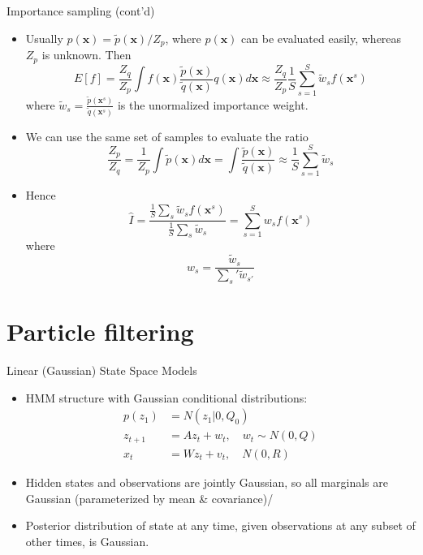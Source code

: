 \documentclass[10pt,mathserif]{beamer}
\begin{document}
\begin{frame}{Importance sampling (cont'd)}
\begin{itemize}
    \item Usually $p(\bm{x}) =  \tilde{p}(\bm{x})/Z_p$, where $p(\bm{x})$ can be evaluated easily, whereas $Z_p$ is unknown. Then
    \begin{equation*} 
        E[f] = \frac{Z_q}{Z_p}\int f(\bm{x})\frac{\tilde{p}(\bm{x})}{\tilde{q}(\bm{x})}q(\bm{x}) d\bm{x} \approx \frac{Z_q}{Z_p}\frac{1}{S}\sum_{s=1}^S \tilde{w}_s f(\bm{x}^s)
    \end{equation*} 
    where $\tilde{w}_s = \frac{\tilde{p}(\bm{x}^s)}{\tilde{q}(\bm{x}^s)}$ is the unormalized importance weight.
    \item We can use the same set of samples to evaluate the ratio
    \begin{equation*} 
        \frac{Z_p}{Z_q} = \frac{1}{Z_p}\int\tilde{p}(\bm{x})d\bm{x} = \int\frac{\tilde{p}(\bm{x})}{\tilde{q}(\bm{x})} \approx \frac{1}{S}\sum_{s=1}^S \tilde{w}_s
    \end{equation*} 
    \item Hence
    \begin{equation*} 
        \hat{I} = \frac{\frac{1}{S}\sum_s \tilde{w}_s f(\bm{x}^s)}{\frac{1}{S}\sum_s \tilde{w}_s} =  \sum_{s = 1}^S w_s f(\bm{x}^s)
    \end{equation*} 
    where
    \begin{equation*} 
        w_s = \frac{\tilde{w}_s}{\sum_s' \tilde{w}_{s'}}
    \end{equation*} 
\end{itemize}    
\end{frame}

\section{Particle filtering}

\begin{frame}{Linear (Gaussian) State Space Models}
\begin{itemize}
    \item HMM structure with Gaussian conditional distributions:
    \begin{equation*}
        \begin{split}
            p(z_1) & =  N(z_1|0,Q_0)\\
            z_{t+1} & = Az_t + w_t, \quad w_t\sim N(0,Q)\\
            x_t & = Wz_t + v_t, \quad N(0,R)
        \end{split}
    \end{equation*}
    \item Hidden states and observations are jointly Gaussian, so all marginals are Gaussian (parameterized by mean \& covariance)/
    \item Posterior distribution of state at any time, given observations at any subset of other times, is Gaussian.
\end{itemize}
\end{frame}
\end{document}
